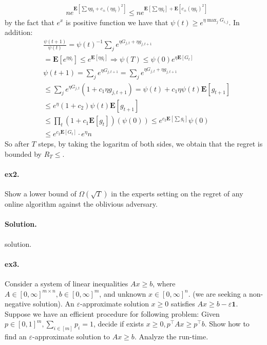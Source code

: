 \documentclass{article}
\newcommand{\expp}[1]{ \mathbf{E} \left[ {#1} \right]}
\begin{document}
\begin{multicols*}{2}
\begin{equation*}
\begin{split}
& n e^{\expp{ \sum {\eta g_{t} + c_{\pm}\left( \eta g_{t} \right)^{2} }}} \le n e^{\expp{ \sum {\eta g_{t}}} +\expp{{ c_{\pm}\left( \eta g_{t} \right)^{2} }}}
  \end{split}
\end{equation*}
  by the fact that $e^{x}$ is positive function we have that $\psi\left( t \right) \ge e^{\eta \max_j G_{i,j}}$. In addition: 
  \begin{equation*}
    \begin{split}
      & \frac{\psi\left( t+1 \right)}{\psi\left( t \right)} = \psi\left( t \right)^{-1} \sum_{j}{ e^{\eta G_{j,t} + \eta g_{j,t+1}}} \\
      & = \expp{e^{\eta g_{t}}} \le e^{\expp{\eta g_{t}}} \Rightarrow \psi\left( T \right) \le \psi\left( 0 \right) e^{\eta \expp{G_{t}}} \\
      & \psi\left( t + 1 \right) =  \sum_{j}{ e^{\eta G_{j,t+1}}} =\sum_{j}{ e^{\eta G_{j,t} + \eta g_{j,t+1}}}  \\
      & \le \sum_{j}{ e^{\eta G_{j,t}  }\left(  1 + c_{1} \eta g_{j,t+1} \right) }= \psi\left( t \right)  +  c_{1}\eta \psi\left( t \right) \expp{g_{t+1}}  \\
      & \le  e^{\eta} \left( 1 +  c_{2} \right) \psi\left( t \right) \expp{g_{t+1}}  \\
      & \le \prod_{t}{ \left( 1 + c_{1} \expp{g_{t}}\right) }\left( \psi\left( 0 \right) \right) \le e ^{c_{2} \expp{ \sum{g_{t} } }}\psi\left(0  \right) \\ 
      & \le e^{c_{2}\expp{G_{t}}} \cdot e^{\eta}n 
    \end{split}
  \end{equation*}
  So after $T$ steps, by taking the logaritm of both sides, we obtain that the regret is bounded by $ R_{T} \le   $.
  \paragraph{ex2.} Show a lower bound of $\Omega\left( \sqrt{T} \right)$ in the experts setting on the regret of any online algorithm against the oblivious adversary. 

  \paragraph{Solution.} solution. 
  \paragraph{ex3.}Consider a system of linear inequalities $Ax \ge b$, where $A\in [0, \infty]^{m\times n} , b \in  [0, \infty]^{m}$, and unknown $x \in  [0, \infty]^{ n}$. (we are seeking a non-negative solution). An $\varepsilon$-approximate solution $x\ge 0$ satisfies $Ax\ge b - \varepsilon \mathbf{1}$. Suppose we have an efficient procedure for following problem: Given $p \in [0,1]^{m}, \sum_{i \in [m]}{p_{i}} = 1$, decide if exists $x \ge 0, p^{\top}Ax \ge p^{\top}b$. Show how to find an $\varepsilon$-approximate solution to $Ax \ge b$. Analyze the run-time. 

\end{multicols*}
\end{document}

